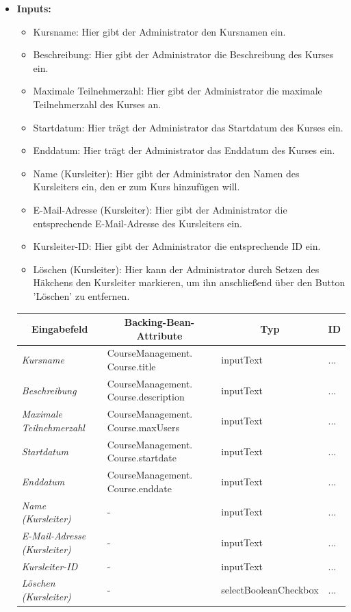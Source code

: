 \begin{itemize}
				
			\item \textbf{Inputs:}
				\begin{itemize}
					\item Kursname: Hier gibt der Administrator den Kursnamen ein.
					\item Beschreibung: Hier gibt der Administrator die Beschreibung des Kurses ein.
					\item Maximale Teilnehmerzahl: Hier gibt der Administrator die maximale Teilnehmerzahl des Kurses an.
					\item Startdatum: Hier trägt der Administrator das Startdatum des Kurses ein.
					\item Enddatum: Hier trägt der Administrator das Enddatum des Kurses ein.
					\item Name (Kursleiter): Hier gibt der Administrator den Namen des Kursleiters ein, den er zum Kurs hinzufügen will.
					\item E-Mail-Adresse (Kursleiter): Hier gibt der Administrator die entsprechende E-Mail-Adresse des Kursleiters ein.
					\item Kursleiter-ID: Hier gibt der Administrator die entsprechende ID ein.
					\item Löschen (Kursleiter): Hier kann der Administrator durch Setzen des Häkchens den Kursleiter markieren, um ihn anschließend über den Button 'Löschen' zu entfernen.
				\end{itemize}
				
				\begin{center}
					\begin{longtable}{|p{3cm} |p{5cm} | p{4cm}|p{3cm}|}
						
						\hline \multicolumn{1}{|c|}{\textbf{Eingabefeld}} & \multicolumn{1}{|c|}{\textbf{Backing-Bean-Attribute}} & \multicolumn{1}{|c|}{\textbf{Typ}}  &  \multicolumn{1}{|c|}{\textbf{ID}} \\ \hline
						\endfirsthead
						\hline
						\endlastfoot
						\textit{Kursname} & CourseManagement. Course.title & inputText & ... \\ \hline
						\textit{Beschreibung} & CourseManagement. Course.description & inputText & ... \\ \hline
						\textit{Maximale Teilnehmerzahl} & CourseManagement. Course.maxUsers & inputText & ... \\ \hline
						\textit{Startdatum} & CourseManagement. Course.startdate & inputText & ... \\ \hline
						\textit{Enddatum} & CourseManagement. Course.enddate & inputText & ... \\ \hline
						\textit{Name (Kursleiter)} & - & inputText & ... \\ \hline
						\textit{E-Mail-Adresse (Kursleiter)} & - & inputText & ... \\ \hline
						\textit{Kursleiter-ID} & - & inputText & ... \\ \hline
						\textit{Löschen (Kursleiter)} & - & selectBooleanCheckbox & ... \\ \hline
					\end{longtable}
				\end{center}
				

\end{itemize}
